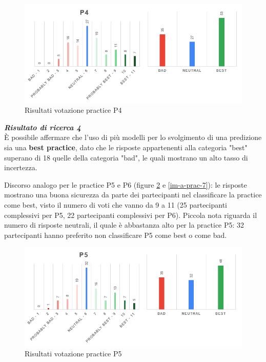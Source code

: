 \begin{figure}[h!]
    \centering
    \includegraphics[width=1\textwidth]{figure/data-analysis3/P4.png}
    \caption{Risultati votazione practice P4}
    \label{im-a-prac-5}
\end{figure}

\begin{center}
    \begin{tcolorbox}[width=400pt, colframe=black, colback=Gray!30]
		\begin{minipage}{\textwidth}
			\textit{\faKey \textbf{ Risultato di ricerca 4}}\\
			È possibile affermare che l'uso di più modelli per lo svolgimento di una predizione sia una \textbf{best practice}, dato che le risposte appartenenti alla categoria "best" superano di 18 quelle della categoria "bad", le quali mostrano un alto tasso di incertezza.
		\end{minipage}
	\end{tcolorbox}
\end{center}

Discorso analogo per le practice P5 e P6 (figure \ref{im-a-prac-6} e \ref{im-a-prac-7}): le risposte mostrano una buona sicurezza da parte dei partecipanti nel classificare la practice come best, visto il numero di voti che vanno da 9 a 11 (25 partecipanti complessivi per P5, 22 partecipanti complessivi per P6). Piccola nota riguarda il numero di risposte neutrali, il quale è abbastanza alto per la practice P5: 32 partecipanti hanno preferito non classificare P5 come best o come bad.

\begin{figure}[h!]
    \centering
    \includegraphics[width=1\textwidth]{figure/data-analysis3/P5.png}
    \caption{Risultati votazione practice P5}
    \label{im-a-prac-6}
\end{figure}

